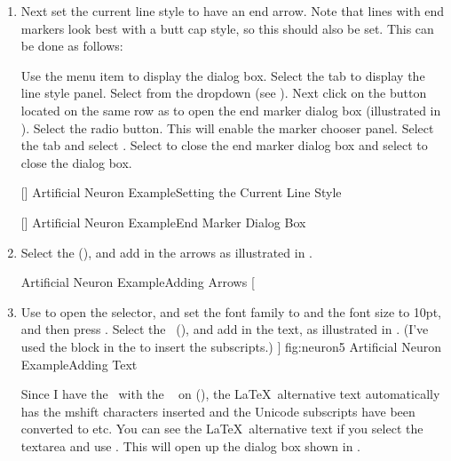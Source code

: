 \begin{enumerate}
\item Next set the current line style to have an end
arrow. Note that lines with end markers look best with a butt cap
style, so this should also be set. This can be done as follows:

Use the  menu item to display the
 dialog box. Select the  tab
to display the line style panel.  Select 
from the  \gls*{dropdown} (see
).  Next click on the 
button located on the same row as  to
open the end marker dialog box (illustrated in
). Select the
 radio button. This will enable the marker
chooser panel. Select the  tab and select
. Select  to close the end marker
dialog box and select  to close the 
dialog box.

[]
{}
{Artificial Neuron Example\dash Setting the Current Line Style}

[]
{}
{Artificial Neuron Example\dash End Marker Dialog Box}

\item Select the  (), and
add in the arrows as illustrated in .

{}
{Artificial Neuron Example\dash Adding Arrows}
[
    \item Use  to open the 
    selector, and set the font family to  and the font
    size to 10pt, and then press . Select the
    \mathstool\ (), and add
    in the text, as illustrated in .
    (I've used the
     block in the
     to insert the subscripts.)
]
{fig:neuron5}
{}
{Artificial Neuron Example\dash Adding Text}

Since I have the \mathstool\ with the \mathsmode\
 on
(), the \LaTeX\ alternative text
automatically has the \glsdesc{mshift} characters inserted and the
Unicode subscripts have been converted to \glssymbol{underscore} etc. You can
see the \LaTeX\ alternative text if you select the \gls{textarea}
and use \menu{edit.textarea.edit}. This will open up the
 dialog box shown in .


\end{enumerate}
